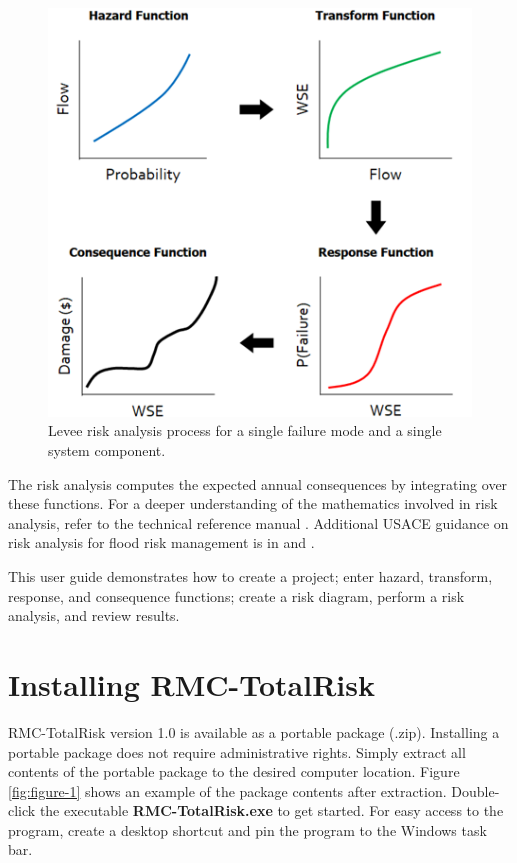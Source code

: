\documentclass[
]{book}
\begin{document}
\begin{figure}

{\centering \includegraphics{images/figure0} 

}

\caption{Levee risk analysis process for a single failure mode and a single system component.}\label{fig:figure-0}
\end{figure}

The risk analysis computes the expected annual consequences by integrating over these functions. For a deeper understanding of the mathematics involved in risk analysis, refer to the technical reference manual \citep{cite-TechRef}. Additional USACE guidance on risk analysis for flood risk management is in \citep{cite-EM1619} and \citep{cite-BestPractices}.

This user guide demonstrates how to create a project; enter hazard, transform, response, and consequence functions; create a risk diagram, perform a risk analysis, and review results.

\hypertarget{installation}{%
\chapter{Installing RMC-TotalRisk}\label{installation}}

RMC-TotalRisk version 1.0 is available as a portable package (.zip). Installing a portable package does not require administrative rights. Simply extract all contents of the portable package to the desired computer location. Figure \ref{fig:figure-1} shows an example of the package contents after extraction. Double-click the executable \textbf{RMC-TotalRisk.exe} to get started. For easy access to the program, create a desktop shortcut and pin the program to the Windows task bar.
\end{document}
